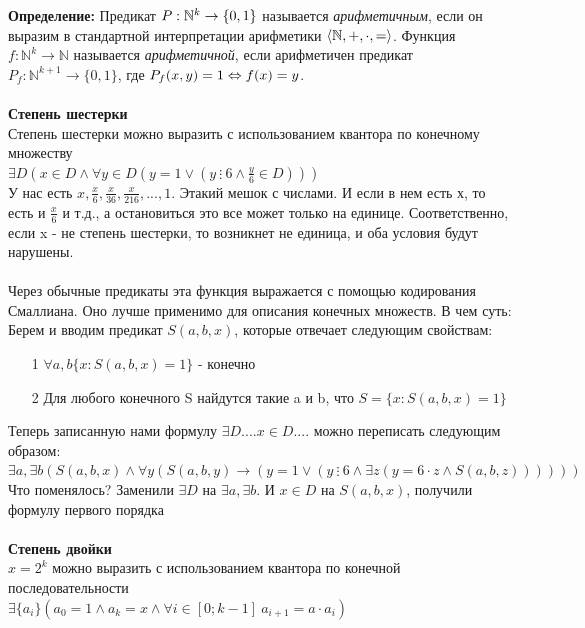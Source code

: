 \textbf{Определение:} Предикат $P: \mathbb{N}^k \to \{0,1\}$ называется \textit{арифметичным}, если он выразим в стандартной интерпретации арифметики $\langle \mathbb{N}, +, \cdot, = \rangle$. Функция $f: \mathbb{N}^k \rightarrow \mathbb{N}$ называется \textit{арифметичной}, если арифметичен предикат $P_{f}: \mathbb{N}^{k+1} \rightarrow \{0,1\}$, где $P_f(x,y) = 1 \Leftrightarrow f(x) = y$.
\\
\\
\textbf{Степень шестерки}
\\
Степень шестерки можно выразить с использованием квантора по конечному множеству\\
    $\exists D (x \in D \wedge \forall y \in D (y = 1 \vee (y \ \vdots \ 6 \wedge \frac{y}{6} \in D)))$ \\ У нас есть $x, \frac{x}{6}, \frac{x}{36}, \frac{x}{216}, ..., 1$. Этакий мешок с числами. И если в нем есть х, то есть и $\frac{x}{6}$ и т.д., а остановиться это все может только на единице. Соответственно, если x - не степень шестерки, то возникнет не единица, и оба условия будут нарушены.
    \\
    \\
    Через обычные предикаты эта функция выражается с помощью кодирования Смаллиана. Оно лучше применимо для описания конечных множеств. В чем суть:
    \\
    Берем и вводим предикат $S(a,b,x)$, которые отвечает следующим свойствам:
    \begin{itemize}
        \item [1] $\forall a,b\{x: S(a,b,x) = 1\}$ - конечно
        \item[2] Для любого конечного S найдутся такие a и b, что $S = \{x: S(a,b,x) = 1\}$
    \end{itemize}
    Теперь записанную нами формулу $\exists D .... x \in D....$ можно переписать следующим образом:\\
    $\exists a,\exists b (S(a,b,x) \wedge \forall y(S(a,b,y) \rightarrow (y = 1 \vee(y \ \vdots \ 6 \wedge \exists z(y = 6\cdot z \wedge S(a,b,z))))))$ \\
    Что поменялось? Заменили $\exists D$ на $\exists a, \exists b$. И $x \in D$ на $S(a,b,x)$, получили формулу первого порядка\\\\
\textbf{Степень двойки}\\
$x = 2^k $ можно выразить с использованием квантора по конечной последовательности\\
$\exists \{a_i\} (a_0 = 1 \wedge a_k = x \wedge \forall i \in [0;k-1] \ a_{i+1} = a\cdot a_i)$
